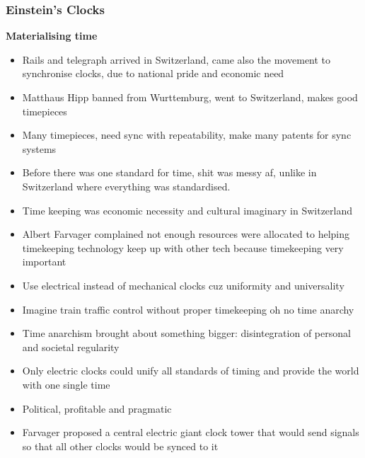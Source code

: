 \documentclass[a4paper]{article}
\begin{document}
\subsubsection{Einstein's Clocks}
\textbf{Materialising time}
\begin{itemize}
	\item Rails and telegraph arrived in Switzerland, came also the movement to synchronise clocks, due to national pride and economic need
	\item Matthaus Hipp banned from Wurttemburg, went to Switzerland, makes good timepieces
	\item Many timepieces, need sync with repeatability, make many patents for sync systems
	\item Before there was one standard for time, shit was messy af, unlike in Switzerland where everything was standardised.
	\item Time keeping was economic necessity and cultural imaginary in Switzerland
	\item Albert Farvager complained not enough resources were allocated to helping timekeeping technology keep up with other tech because timekeeping very important
	\item Use electrical instead of mechanical clocks cuz uniformity and universality
	\item Imagine train traffic control without proper timekeeping oh no time anarchy
	\item Time anarchism brought about something bigger: disintegration of personal and societal regularity
	\item Only electric clocks could unify all standards of timing and provide the world with one single time
	\item Political, profitable and pragmatic
	\item Farvager proposed a central electric giant clock tower that would send signals so that all other clocks would be synced to it
\end{itemize}

\medskip
\end{document}
